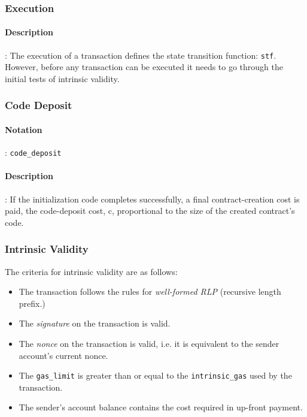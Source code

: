 \documentclass[10pt,a4paper,leqno,bibliography=totoc]{scrartcl}
\newenvironment{alphafootnotes}
{\par\edef\savedfootnotenumber{\number\value{footnote}}
\renewcommand{\thefootnote}{\alph{footnote}}
\setcounter{footnote}{0}}
{\par\setcounter{footnote}{\savedfootnotenumber}}
\begin{document}
\begin{alphafootnotes}
\begin{multicols*}{2}
			\subsubsection{Execution}
				\paragraph{Description}: The execution of a transaction defines the state transition function: \texttt{stf}. However, before any transaction can be executed it needs to go through the initial tests of intrinsic validity. 
			\subsubsection{Code Deposit}
				\paragraph{Notation}: \texttt{code\_deposit}
				\paragraph{Description}: If the initialization code completes successfully, a final contract-creation cost is paid, the code-deposit cost, c, proportional to the size of the created contract's code. 
			
			\subsubsection{Intrinsic Validity}
				The criteria for intrinsic validity are as follows:
				\begin{itemize}
				\item The transaction follows the rules for \textsl{well-formed RLP} (recursive length prefix.)
				\item The \textsl{signature} on the transaction is valid.
				\item The \textsl{nonce} on the transaction is valid, i.e. it is equivalent to the sender account's current nonce.
				\item The \texttt{gas\_limit} is greater than or equal to the \texttt{intrinsic\_gas} used by the transaction.
				\item The sender's account balance contains the cost required in up-front payment.
				\end{itemize}


\end{multicols*}
\end{alphafootnotes}
\end{document}
